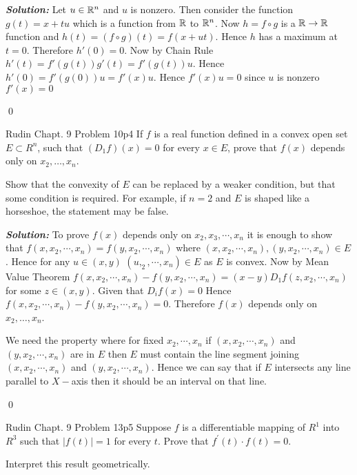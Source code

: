 \documentclass[a4paper, 11pt]{article}
\newcommand{\Qed}{\begin{flushright}\qed\end{flushright}}
\newcommand{\sol}[1]{\begin{solution}#1\end{solution}\Qed}
\newcommand{\parinn}{\setlength{\parindent}{1cm}}
\newenvironment{solution}
{\textbf{\textit{Solution: }}\setlength{\parindent}{1cm}}
{}
\begin{document}
	\sol{Let $u\in \mathbb{R}^n$ and $u$ is nonzero. Then consider the function $g(t)=x+tu$ which is a function from $\mathbb{R}$ to $\mathbb{R}^n$. Now $h=f\circ g$ is a $\mathbb{R}\to\mathbb{R}$ function and $h(t)=(f\circ g)(t)=f(x+ut)$. Hence $h$ has a maximum at $t=0$. Therefore $h'(0)=0$. Now by Chain Rule $h'(t)=f'(g(t))g'(t)=f'(g(t))u$. Hence $h'(0)=f'(g(0))u=f'(x)u$. Hence $f'(x)u=0$ since $u$ is nonzero $f'(x)=0$}
	
	
	
	\begin{problem}{Rudin Chapt. 9 Problem 10}{p4%
		}
				If $f$ is a real function defined in a convex open set $E \subset R^{n}$, such that $\left(D_{1} f\right)(x)=0$ for every $x \in E$, prove that $f(x)$ depends only on $x_{2}, \ldots, x_{n}$.\parinn
				
				Show that the convexity of $E$ can be replaced by a weaker condition, but that some condition is required. For example, if $n=2$ and $E$ is shaped like a horseshoe, the statement may be false.
	\end{problem}
	
	\sol{To prove $f(x)$ depends only on $x_2,x_3,\cdots,x_n$ it is enough to show that $f(x,x_2,\cdots,x_n)=f(y,x_2,\cdots,x_n)$ where $(x,x_2,\cdots,x_n),(y,x_2,\cdots,x_n)\in E$. Hence for any $u\in (x,y)$ $(u,_2,\cdots,x_n)\in E$ as $E$ is convex. Now by Mean Value Theorem $f(x,x_2,\cdots,x_n)-f(y,x_2,\cdots,x_n)=(x-y)D_1f(z,x_2,\cdots,x_n)$ for some $z\in (x,y)$. Given that $D_if(x)=0$ Hence $f(x,x_2,\cdots,x_n)-f(y,x_2,\cdots,x_n)=0$. Therefore $f(x)$ depends only on $x_{2}, \ldots, x_{n}$.
		
		We need the property where for fixed $x_2,\cdots,x_n$ if $(x,x_2,\cdots,x_n)$ and $(y,x_2,\cdots,x_n)$ are in $E$ then $E$ must contain the line segment joining $(x,x_2,\cdots,x_n)$ and $(y,x_2,\cdots,x_n)$. Hence we can say that if $E$ intersects any line parallel to $X-$axis then it should be an interval on that line.
	
}
	
	
	
	\begin{problem}{Rudin Chapt. 9 Problem 13}{p5%
		}
		Suppose $f$ is a differentiable mapping of $R^{1}$ into $R^{3}$ such that $|f(t)|=1$ for every $t$. Prove that $f^{\prime}(t) \cdot f(t)=0$.\parinn
		
		Interpret this result geometrically.
	\end{problem}
	
\end{document}
